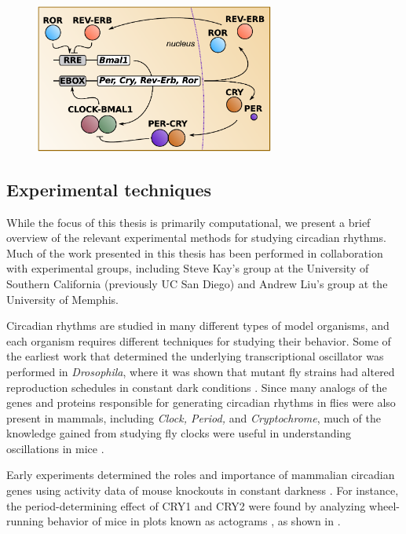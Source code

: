 \begin{figure}[tbp]
  \centering
  \includegraphics[width=0.7\textwidth]{chap1/figures/coreloop.pdf}
  \label{fig:coreloop}
\end{figure}

\subsection{Experimental techniques}

While the focus of this thesis is primarily computational, we present a brief overview of the relevant experimental methods for studying circadian rhythms.
Much of the work presented in this thesis has been performed in collaboration with experimental groups, including Steve Kay's group at the University of Southern California (previously UC San Diego) and Andrew Liu's group at the University of Memphis.

Circadian rhythms are studied in many different types of model organisms, and each organism requires different techniques for studying their behavior.
Some of the earliest work that determined the underlying transcriptional oscillator was performed in {\itshape Drosophila}, where it was shown that mutant fly strains had altered reproduction schedules in constant dark conditions \cite{Panda2002}.
Since many analogs of the genes and proteins responsible for generating circadian rhythms in flies were also present in mammals, including {\itshape Clock, Period,} and {\itshape Cryptochrome}, much of the knowledge gained from studying fly clocks were useful in understanding oscillations in mice \cite{Panda2002}.

Early  experiments determined the roles and importance of mammalian circadian genes using activity data of mouse knockouts in constant darkness \cite{Vitaterna1994}.
For instance, the period-determining effect of CRY1 and CRY2 were found by analyzing wheel-running behavior of mice in plots known as actograms \cite{VanderHorst1999}, as shown in .

